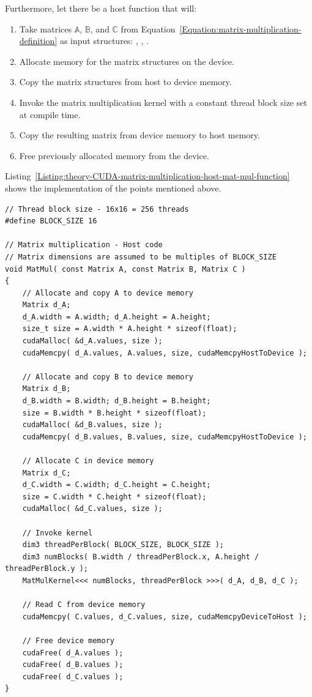 Furthermore, let there be a host function  that will:

\begin{enumerate}
	\item Take matrices $ \mathbb{A} $, $ \mathbb{B} $, and $ \mathbb{C} $ from Equation~\ref{Equation:matrix-multiplication-definition} as input structures: , , .
	\item Allocate memory for the matrix structures on the device.
	\item Copy the matrix structures from host to device memory.
	\item Invoke the matrix multiplication kernel with a constant thread block size set at compile time.
	\item Copy the resulting matrix from device memory to host memory.
	\item Free previously allocated memory from the device.
\end{enumerate}

Listing~\ref{Listing:theory-CUDA-matrix-multiplication-host-mat-mul-function} shows the implementation of the points mentioned above.

\begin{lstlisting}[caption={Definition of the function that will allocate and copy all matrices to the device, invoke the kernel and then free the device memory. The size of the thread block is constant and set during compile time using the \code{\#define} macro. Taken from Nvidia's \emph{CUDA C++ Programming Guide} \cite{NVIDIAMay2022}.},label={Listing:theory-CUDA-matrix-multiplication-host-mat-mul-function}]
// Thread block size - 16x16 = 256 threads
#define BLOCK_SIZE 16

// Matrix multiplication - Host code
// Matrix dimensions are assumed to be multiples of BLOCK_SIZE
void MatMul( const Matrix A, const Matrix B, Matrix C )
{
	// Allocate and copy A to device memory
	Matrix d_A;
	d_A.width = A.width; d_A.height = A.height;
	size_t size = A.width * A.height * sizeof(float);
	cudaMalloc( &d_A.values, size );
	cudaMemcpy( d_A.values, A.values, size, cudaMemcpyHostToDevice );
	
	// Allocate and copy B to device memory
	Matrix d_B;
	d_B.width = B.width; d_B.height = B.height;
	size = B.width * B.height * sizeof(float);
	cudaMalloc( &d_B.values, size );
	cudaMemcpy( d_B.values, B.values, size, cudaMemcpyHostToDevice );
	
	// Allocate C in device memory
	Matrix d_C;
	d_C.width = C.width; d_C.height = C.height;
	size = C.width * C.height * sizeof(float);
	cudaMalloc( &d_C.values, size );
	
	// Invoke kernel
	dim3 threadPerBlock( BLOCK_SIZE, BLOCK_SIZE );
	dim3 numBlocks( B.width / threadPerBlock.x, A.height / threadPerBlock.y );
	MatMulKernel<<< numBlocks, threadPerBlock >>>( d_A, d_B, d_C );
	
	// Read C from device memory
	cudaMemcpy( C.values, d_C.values, size, cudaMemcpyDeviceToHost );
	
	// Free device memory
	cudaFree( d_A.values );
	cudaFree( d_B.values );
	cudaFree( d_C.values );
}
\end{lstlisting}


